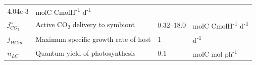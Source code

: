 \documentclass[]{elsarticle} %
\begin{document}
\begin{longtable}[c]{@{}llll@{}}
\begin{minipage}[t]{0.09\columnwidth}\raggedright\strut
4.04e-3
\strut\end{minipage} &
\begin{minipage}[t]{0.23\columnwidth}\raggedright\strut
molC CmolH\textsuperscript{-1} d\textsuperscript{-1}
\strut\end{minipage}\tabularnewline
\begin{minipage}[t]{0.10\columnwidth}\raggedright\strut
\(j_{CO_2}^a\)
\strut\end{minipage} &
\begin{minipage}[t]{0.48\columnwidth}\raggedright\strut
Active CO\textsubscript{2} delivery to symbiont
\strut\end{minipage} &
\begin{minipage}[t]{0.09\columnwidth}\raggedright\strut
0.32--18.0
\strut\end{minipage} &
\begin{minipage}[t]{0.23\columnwidth}\raggedright\strut
molC CmolH\textsuperscript{-1} d\textsuperscript{-1}
\strut\end{minipage}\tabularnewline
\begin{minipage}[t]{0.10\columnwidth}\raggedright\strut
\(j_{HGm}\)
\strut\end{minipage} &
\begin{minipage}[t]{0.48\columnwidth}\raggedright\strut
Maximum specific growth rate of host
\strut\end{minipage} &
\begin{minipage}[t]{0.09\columnwidth}\raggedright\strut
1
\strut\end{minipage} &
\begin{minipage}[t]{0.23\columnwidth}\raggedright\strut
d\textsuperscript{-1}
\strut\end{minipage}\tabularnewline
\begin{minipage}[t]{0.10\columnwidth}\raggedright\strut
\(n_{LC}\)
\strut\end{minipage} &
\begin{minipage}[t]{0.48\columnwidth}\raggedright\strut
Quantum yield of photosynthesis
\strut\end{minipage} &
\begin{minipage}[t]{0.09\columnwidth}\raggedright\strut
0.1
\strut\end{minipage} &
\begin{minipage}[t]{0.23\columnwidth}\raggedright\strut
molC mol ph\textsuperscript{-1}
\strut\end{minipage}\tabularnewline

\end{longtable}
\end{document}
